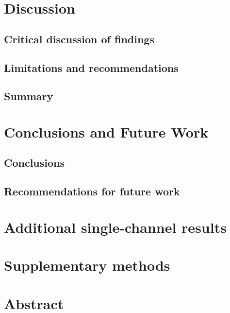 \documentclass[ %
                    author={Daniel Page},
                supervisor={Dr. Andrew Calway},
                    degree={MSc},
                     title={Some Structural Guidelines for Data Science MSc Theses, Including Those With Long Titles that Run Across Multiple Lines on the Front Page},
                  subtitle={And those including an optional subtitle too, for good measure},
                      type={},
                      year={2021}]{dissertation}
\begin{document}
\chapter{Discussion}
\section{Critical discussion of findings}
\section{Limitations and recommendations}
\section{Summary}

\chapter{Conclusions and Future Work}
\section{Conclusions}
\section{Recommendations for future work}

\appendix
\chapter{Additional single-channel results}
\chapter{Supplementary methods}
\listoffigures
\listoftables
\listofalgorithms
\lstlistoflistings



\chapter*{Abstract}
\end{document}

